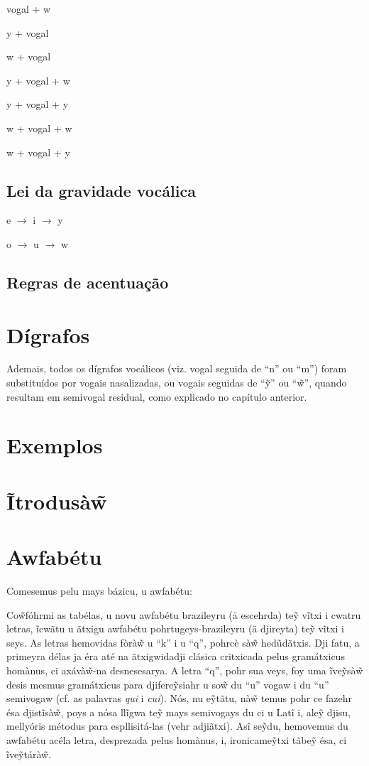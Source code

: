 \documentclass[12pt, a5paper, titlepage]{article}
\begin{document}
\begin{bilingualpages}
    vogal + w

    y + vogal

    w + vogal

    y + vogal + w

    y + vogal + y

    w + vogal + w

    w + vogal + y

    \subsection{Lei da gravidade vocálica}
    e $\rightarrow$ i $\rightarrow$ y

    o $\rightarrow$ u $\rightarrow$ w

    \subsection{Regras de acentuação}

    \section{Dígrafos}
    \PtTableDigraphs

    Ademais, todos os dígrafos vocálicos (viz. vogal seguida de ``n'' ou ``m'')
    foram substituídos por vogais nasalizadas, ou vogais seguidas de ``\~y'' ou
    ``\~w'', quando resultam em semivogal residual, como explicado no capítulo
    anterior.

    \section{Exemplos}

    \leftpage
    \section{Ĩtrodusà\~w}

    \newpage
    \section{Awfabétu}
    Comesemus pelu mays bázicu, u awfabétu: \BrTableAbc

    Co\~wfóhrmi as tabélas, u novu awfabétu brazileyru (ä escehrda) te\~y vĩtxi i
    cwatru letras, ĩcwãtu u ãtxigu awfabétu pohrtugeys-brazileyru (ä djireyta)
    te\~y vĩtxi i seys. As letras hemovidas fòrà\~w u ``k'' i u ``q'', pohrcè sà\~w
    hedũdãtxis. Dji fatu, a primeyra délas ja éra até na ãtxigwidadji clásica
    critxicada pelus gramátxicus homànus, ci axávà\~w-na desnesesarya. A letra
    ``q'', pohr sua veys, foy uma ĩve\~ysà\~w desis mesmus gramátxicus para
    djifere\~ysiahr u so\~w du ``u'' vogaw i du ``u'' semivogaw (cf. as palavras
    \textit{qui} i \textit{cui}). Nós, nu e\~ytãtu, nà\~w temus pohr ce fazehr ésa
    djistĩsà\~w, poys a nósa llĩgwa te\~y mays semivogays du ci u Latî i, ale\~y
    djisu, mellyóris métodus para espllisitá-las (vehr adjiãtxi). Asî se\~ydu,
    hemovemus du awfabétu acéla letra, desprezada pelus homànus, i, ironicame\~ytxi
    tãbe\~y ésa, ci ĩve\~ytárà\~w.


\end{bilingualpages}
\end{document}
